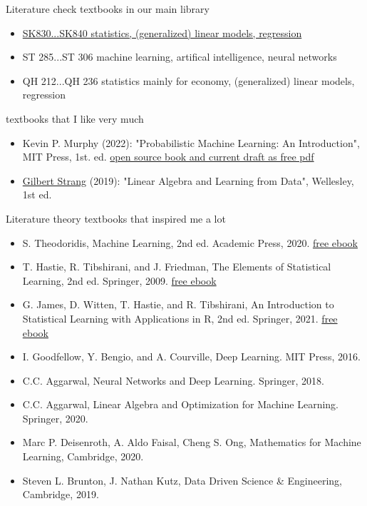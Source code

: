 \documentclass[mathserif, aspectratio=43]{intbeamer}
\begin{document}
\begin{frame}{Literature}
  check textbooks in our main library
  \begin{itemize}
    \item \href{https://find.ub.uni-rostock.de/sk830}{SK830...SK840 statistics, (generalized) linear models, regression}
    \item ST 285...ST 306 machine learning, artifical intelligence, neural networks
    \item QH 212...QH 236 statistics mainly for economy, (generalized) linear models, regression
  \end{itemize}
  textbooks that I like very much
  \begin{itemize}
    \item Kevin P. Murphy (2022): "Probabilistic Machine Learning: An Introduction", MIT Press, 1st. ed.
    \href{https://probml.github.io/pml-book/book1.html}{open source book and current draft as free pdf}
    \item \href{https://math.mit.edu/~gs/}{Gilbert Strang} (2019): "Linear Algebra and Learning from Data", Wellesley, 1st ed.
  \end{itemize}
\end{frame}

\begin{frame}{Literature}
  theory textbooks that inspired me a lot
  \begin{itemize}
    \item S. Theodoridis, Machine Learning, 2nd ed. Academic Press, 2020.
    \href{https://www.sciencedirect.com/book/9780128188033/machine-learning}{free ebook}
    \item T. Hastie, R. Tibshirani, and J. Friedman, The Elements of Statistical Learning, 2nd ed. Springer, 2009.
    \href{https://hastie.su.domains/ElemStatLearn/}{free ebook}
    \item G. James, D. Witten, T. Hastie, and R. Tibshirani, An Introduction to Statistical Learning with Applications in R, 2nd ed. Springer, 2021. \href{https://www.statlearning.com/}{free ebook}
    \item I. Goodfellow, Y. Bengio, and A. Courville, Deep Learning. MIT Press, 2016.
    \item C.C. Aggarwal, Neural Networks and Deep Learning. Springer, 2018.
    \item C.C. Aggarwal, Linear Algebra and Optimization for Machine Learning. Springer, 2020.
    \item Marc P. Deisenroth, A. Aldo Faisal, Cheng S. Ong, Mathematics for Machine Learning, Cambridge, 2020.
    \item Steven L. Brunton, J. Nathan Kutz, Data Driven Science \& Engineering, Cambridge, 2019.
  \end{itemize}
\end{frame}
\end{document}
